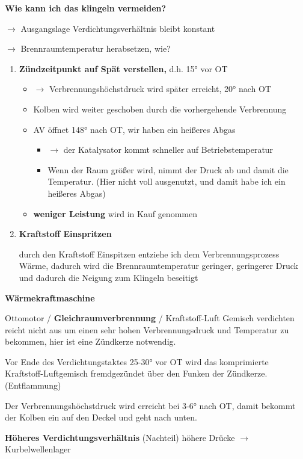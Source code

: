 \textbf{Wie kann ich das klingeln vermeiden?}

$\to$ Ausgangslage Verdichtungsverhältnis bleibt konstant

$\to$ Brennraumtemperatur herabsetzen, wie?

\begin{enumerate}
\item
  \textbf{Zündzeitpunkt auf Spät verstellen,} d.h. 15° vor OT

  \begin{itemize}
  \item
    $\to$ Verbrennungshöchstdruck wird später erreicht, 20° nach OT
  \item
    Kolben wird weiter geschoben durch die vorhergehende Verbrennung
  \item
    AV öffnet 148° nach OT, wir haben ein heißeres Abgas

    \begin{itemize}
    \item
      $\to$ der Katalysator kommt schneller auf Betriebstemperatur
    \item
      Wenn der Raum größer wird, nimmt der Druck ab und damit die
      Temperatur. (Hier nicht voll ausgenutzt, und damit habe ich ein
      heißeres Abgas)
    \end{itemize}
  \item
    \textbf{weniger Leistung} wird in Kauf genommen
  \end{itemize}
\item
  \textbf{Kraftstoff Einspritzen}

  durch den Kraftstoff Einspitzen entziehe ich dem Verbrennungsprozess
  Wärme, dadurch wird die Brennraumtemperatur geringer, geringerer Druck
  und dadurch die Neigung zum Klingeln beseitigt
\end{enumerate}

\textbf{Wärmekraftmaschine}

Ottomotor / \textbf{Gleichraumverbrennung} / Kraftstoff-Luft Gemisch
verdichten reicht nicht aus um einen sehr hohen Verbrennungsdruck und
Temperatur zu bekommen, hier ist eine Zündkerze notwendig.

Vor Ende des Verdichtungstaktes 25-30° vor OT wird das komprimierte
Kraftstoff-Luftgemisch fremdgezündet über den Funken der Zündkerze.
(Entflammung)

Der Verbrennungshöchstdruck wird erreicht bei 3-6° nach OT, damit
bekommt der Kolben ein auf den Deckel und geht nach unten.

\textbf{Höheres Verdichtungsverhältnis} (Nachteil) höhere Drücke $\to$
Kurbelwellenlager

